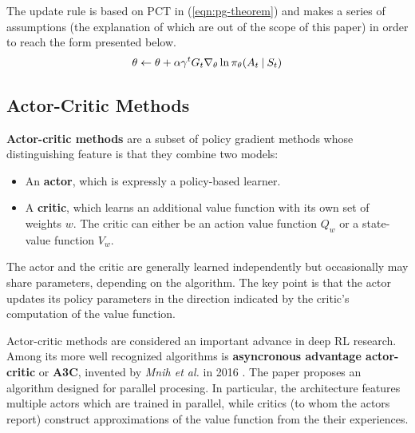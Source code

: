 The update rule is based on PCT in (\ref{eqn:pg-theorem}) and makes a series of assumptions (the explanation of which are out of the scope of this paper) in order to reach the form presented below.
\begin{equation}
    \theta \leftarrow \theta + \alpha \gamma^{t} G_{t} \nabla_{\theta} \ln{\pi_{\theta}(A_{t} \:\vert\: S_{t})}
\end{equation}


\subsection{Actor-Critic Methods} \label{section:actor-critic}
\textbf{Actor-critic methods} are a subset of policy gradient methods whose distinguishing feature is that they combine two models:
\begin{itemize}
    \item An \textbf{actor}, which is expressly a policy-based learner.
    \item A \textbf{critic}, which learns an additional value function with its own set of weights $w$. The critic can either be an action value function $Q_{w}$ or a state-value function $V_{w}$.
\end{itemize}

The actor and the critic are generally learned independently but occasionally may share parameters, depending on the algorithm.
The key point is that the actor updates its policy parameters in the direction indicated by the critic’s computation of the value function.


Actor-critic methods are considered an important advance in deep RL research.
Among its more well recognized algorithms is \textbf{asyncronous advantage actor-critic} or \textbf{A3C}, invented by \emph{Mnih et al.} in 2016 \cite{a3c-paper}.
The paper proposes an algorithm designed for parallel procesing.
In particular, the architecture features multiple actors which are trained in parallel, while critics (to whom the actors report) construct approximations of the value function from the their experiences.